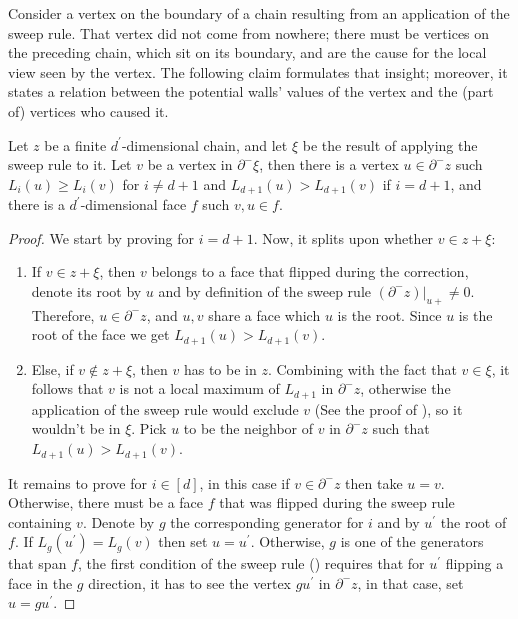 Consider a vertex on the boundary of a chain resulting from an application of the sweep rule. That vertex did not come from nowhere; there must be vertices on the preceding chain, which sit on its boundary, and are the cause for the local view seen by the vertex. The following claim formulates that insight; moreover, it states a relation between the potential walls' values of the vertex and the (part of) vertices who caused it.
\begin{claim} 
  \label{claim:sweepface}
  Let $z$ be a finite $d^{\prime}$-dimensional chain, and let $\xi$ be the result of applying the sweep rule to it. Let $v$ be a vertex in $\partial^{-}\xi$, then there is a vertex $u \in \partial^{-}z$ such $L_{i}(u)\ge L_{i}(v)$ for $i\neq d+1$ and  $L_{d+1}(u) > L_{d+1}(v)$ if $i=d+1$,  and there is a $d^{\prime}$-dimensional face $f$ such $v,u \in f$. 
\end{claim}
\begin{proof}
We start by proving for $i = d + 1$. Now, it splits upon whether $v \in z + \xi$:
  \begin{enumerate}
    \item If $v\in z + \xi$, then $v$ belongs to a face that flipped during the correction, denote its root by $u$ and by definition of the sweep rule $(\partial^{-} z)|_{u+} \neq 0$. Therefore, $u \in \partial^{-}z$, and $u,v$ share a face which $u$ is the root. Since $u$ is the root of the face we get $L_{d+1}(u) > L_{d+1}(v)$. 
    \item Else, if $v \notin z + \xi$, then $v$ has to be in $z$. Combining with the fact that $v \in \xi$, it follows that $v$ is not a local maximum of $L_{d+1}$ in $\partial^{-}z$, otherwise the application of the sweep rule would exclude $v$ (See the proof of ), so it wouldn't be in $\xi$. Pick $u$ to be the neighbor of $v$ in $\partial^{-}z$ such that $L_{d+1}(u) > L_{d+1}(v)$.
  \end{enumerate}
  It remains to prove for $i\in [d]$, in this case if $v \in \partial^{-}z$ then take $u = v$. Otherwise, there must be a face $f$ that was flipped during the sweep rule containing $v$. Denote by $g$ the corresponding generator for $i$ and by $u^{\prime}$ the root of $f$. If $L_{g}(u^{\prime}) = L_{g}(v)$ then set $u = u^{\prime}$. Otherwise, $g$ is one of the generators that span $f$, the first condition of the sweep rule () requires that for $u^\prime$ flipping a face in the $g$ direction, it has to see the vertex $gu^{\prime}$ in $\partial^{-}z$, in that case, set $u=gu^{\prime}$.
\end{proof}


